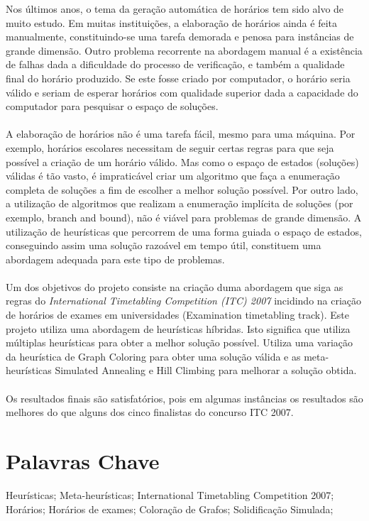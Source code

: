 Nos últimos anos, o tema da geração automática de horários tem sido alvo de muito estudo. Em muitas instituições, a elaboração de horários ainda é feita manualmente, constituindo-se uma tarefa demorada e penosa para instâncias de grande dimensão. Outro problema recorrente na abordagem manual é a existência de falhas dada a dificuldade do processo de verificação, e também a qualidade final do horário produzido. Se este fosse criado por computador, o horário seria válido e seriam de esperar horários com qualidade superior dada a capacidade do computador para pesquisar o espaço de soluções.\\
\\
A elaboração de horários não é uma tarefa fácil, mesmo para uma máquina. Por exemplo, horários escolares necessitam de seguir certas regras para que seja possível a criação de um horário válido. Mas como o espaço de estados (soluções) válidas é tão vasto, é impraticável criar um algoritmo que faça a enumeração completa de soluções a fim de escolher a melhor solução possível. Por outro lado, a utilização de algoritmos que realizam a enumeração implícita de soluções (por exemplo, branch and bound), não é viável para problemas de grande dimensão. A utilização de heurísticas que percorrem de uma forma guiada o espaço de estados, conseguindo assim uma solução razoável em tempo útil, constituem uma abordagem adequada para este tipo de problemas.\\
\\
Um dos objetivos do projeto consiste na criação duma abordagem que siga as regras do \textit{International Timetabling Competition (ITC) 2007} incidindo na criação de horários de exames em universidades (Examination timetabling track). Este projeto utiliza uma abordagem de heurísticas híbridas. Isto significa que utiliza múltiplas heurísticas para obter a melhor solução possível. Utiliza uma variação da heurística de Graph Coloring para obter uma solução válida e as meta-heurísticas Simulated Annealing e Hill Climbing para melhorar a solução obtida.\\
\\
Os resultados finais são satisfatórios, pois em algumas instâncias os resultados são melhores do que alguns dos cinco finalistas do concurso ITC 2007.
\
\section*{Palavras Chave}

Heurísticas; Meta-heurísticas; International Timetabling Competition 2007; Horários; Horários de exames; Coloração de Grafos; Solidificação Simulada;
\

